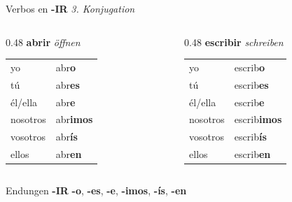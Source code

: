 \documentclass[aspectratio=169, 11pt]{beamer}
\newcommand{\seriftext}[1]{{\fontfamily{ppl}\selectfont #1}}
\newcommand{\es}[1]{\seriftext{\textbf{#1}}}
\newcommand{\de}[1]{\textit{\textcolor{mittelgrau}{#1}}}
\newcommand{\endir}[1]{\textcolor{endungIR}{\textbf{#1}}}
\begin{document}
\begin{frame}{Verbos en \endir{-IR} \de{3. Konjugation}}
    \vspace{0.3cm}

    \begin{columns}[T]
        \begin{column}{0.48\textwidth}
            {\large\es{abrir} \de{öffnen}}

            \vspace{0.4cm}

            \renewcommand{\arraystretch}{1.4}
            \begin{tabular}{ll}
                yo & abr\endir{o} \\
                tú & abr\endir{es} \\
                él/ella & abr\endir{e} \\
                nosotros & abr\endir{imos} \\
                vosotros & abr\endir{ís} \\
                ellos & abr\endir{en} \\
            \end{tabular}
        \end{column}

        \begin{column}{0.48\textwidth}
            {\large\es{escribir} \de{schreiben}}

            \vspace{0.4cm}

            \renewcommand{\arraystretch}{1.4}
            \begin{tabular}{ll}
                yo & escrib\endir{o} \\
                tú & escrib\endir{es} \\
                él/ella & escrib\endir{e} \\
                nosotros & escrib\endir{imos} \\
                vosotros & escrib\endir{ís} \\
                ellos & escrib\endir{en} \\
            \end{tabular}
        \end{column}
    \end{columns}

    \vspace{0.6cm}

    \begin{block}{Endungen \endir{-IR}}
        \endir{-o}, \endir{-es}, \endir{-e}, \endir{-imos}, \endir{-ís}, \endir{-en}
    \end{block}
\end{frame}
\end{document}
